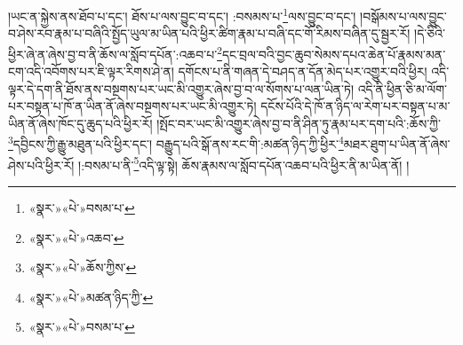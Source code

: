 །ཡང་ན་སྐྱེས་ནས་ཐོབ་པ་དང་། ཐོས་པ་ལས་བྱུང་བ་དང་། :བསམས་པ་\footnote{«སྣར་»«པེ་»བསམ་པ་}ལས་བྱུང་བ་དང་། །བསྒོམས་པ་ལས་བྱུང་བ་ཤེས་རབ་རྣམ་པ་བཞིའི་སྤྱོད་ཡུལ་མ་ཡིན་པའི་ཕྱིར་ཚིག་རྣམ་པ་བཞི་དང་གོ་རིམས་བཞིན་དུ་སྦྱར་རོ། །དེ་ཅིའི་ཕྱིར་ཞེ་ན་ཞེས་བྱ་བ་ནི་ཆོས་ལ་སློབ་དཔོན་:འཆབ་པ་\footnote{«སྣར་»«པེ་»འཆབ་}དང་བྲལ་བའི་བྱང་ཆུབ་སེམས་དཔའ་ཆེན་པོ་རྣམས་མན་ངག་འདི་འབོགས་པར་ཇི་ལྟར་རིགས་ཤེ་ན། དགོངས་པ་ནི་གཞན་དེ་བཤད་ན་དོན་མེད་པར་འགྱུར་བའི་ཕྱིར། འདི་ལྟར་དེ་དག་ནི་ཐོས་ནས་བསྔགས་པར་ཡང་མི་འགྱུར་ཞེས་བྱ་བ་ལ་སོགས་པ་ལན་ཡིན་ཏེ། འདི་ནི་ཕྱིན་ཅི་མ་ལོག་པར་བསྟན་པ་ཁོ་ན་ཡིན་ནོ་ཞེས་བསྔགས་པར་ཡང་མི་འགྱུར་ཏེ། དངོས་པོའི་དེ་ཁོ་ན་ཉིད་ལ་རེག་པར་བསྟན་པ་མ་ཡིན་ནོ་ཞེས་ཁོང་དུ་ཆུད་པའི་ཕྱིར་རོ། །སྤོང་བར་ཡང་མི་འགྱུར་ཞེས་བྱ་བ་ནི་ཤིན་ཏུ་རྣམ་པར་དག་པའི་:ཆོས་ཀྱི་\footnote{«སྣར་»«པེ་»ཆོས་ཀྱིས་}དབྱིངས་ཀྱི་རྒྱུ་མཐུན་པའི་ཕྱིར་དང་། བརྒྱུད་པའི་སྒོ་ནས་རང་གི་:མཚན་ཉིད་ཀྱི་ཕྱིར་\footnote{«སྣར་»«པེ་»མཚན་ཉིད་ཀྱི་}མཐར་ཐུག་པ་ཡིན་ནོ་ཞེས་ཤེས་པའི་ཕྱིར་རོ། །:བསམ་པ་ནི་\footnote{«སྣར་»«པེ་»བསམ་པ་}འདི་ལྟ་སྟེ། ཆོས་རྣམས་ལ་སློབ་དཔོན་འཆབ་པའི་ཕྱིར་ནི་མ་ཡིན་ནོ། །
